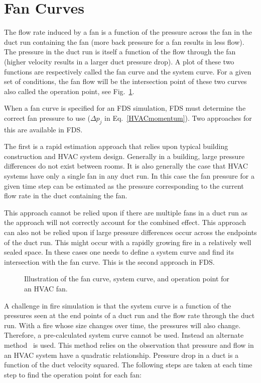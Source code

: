 \section{Fan Curves}

The flow rate induced by a fan is a function of the pressure across the fan in the duct run containing the fan (more back pressure for a fan results in less flow). The pressure in the duct run is itself a function of the flow through the fan (higher velocity results in a larger duct pressure drop). A plot of these two functions are respectively called the fan curve and the system curve. For a given set of conditions, the fan flow will be the intersection point of these two curves also called the operation point, see Fig.~\ref{hvac_curves}.

When a fan curve is specified for an FDS simulation, FDS must determine the correct fan pressure to use ($\Delta p_j$ in Eq.~\ref{HVACmomentum}). Two approaches for this are available in FDS.

The first is a rapid estimation approach that relies upon typical building construction and HVAC system design. Generally in a building, large pressure differences do not exist between rooms. It is also generally the case that HVAC systems have only a single fan in any duct run. In this case the fan pressure for a given time step can be estimated as the pressure corresponding to the current flow rate in the duct containing the fan. 

This approach cannot be relied upon if there are multiple fans in a duct run as the approach will not correctly account for the combined effect. This approach can also not be relied upon if large pressure differences occur across the endpoints of the duct run. This might occur with a rapidly growing fire in a relatively well sealed space. In these cases one needs to define a system curve and find its intersection with the fan curve. This is the second approach in FDS.

\begin{figure}[ht!]
   \begin{center}
      \caption[Illustration of the fan curve, system curve, and operation point for an HVAC fan]{\label{hvac_curves} Illustration of the fan curve, system curve, and operation point for an HVAC fan.}
   \end{center}
\end{figure}

A challenge in fire simulation is that the system curve is a function of the pressures seen at the end points of a duct run and the flow rate through the duct run. With a fire whose size changes over time, the pressures will also change. Therefore, a pre-calculated system curve cannot be used. Instead an alternate method~\cite{Ralph:2} is used. This method relies on the observation that pressure and flow in an HVAC system have a quadratic relationship. Pressure drop in a duct is a function of the duct velocity squared. The following steps are taken at each time step to find the operation point for each fan:


